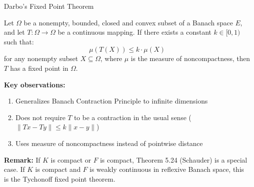 \documentclass[aspectratio=169,10pt]{beamer}
\begin{document}
\begin{frame}{Darbo's Fixed Point Theorem}

\begin{theorem}[6.24 - Darbo]
Let $\Omega$ be a nonempty, bounded, closed and convex subset of a Banach space $E$, and let $T: \Omega \to \Omega$ be a continuous mapping. If there exists a constant $k \in [0, 1)$ such that:
\[
\mu(T(X)) \leq k \cdot \mu(X)
\]
for any nonempty subset $X \subseteq \Omega$, where $\mu$ is the measure of noncompactness, then $T$ has a fixed point in $\Omega$.
\end{theorem}

\vspace{0.3cm}

\textbf{Key observations:}
\begin{enumerate}
    \item Generalizes Banach Contraction Principle to infinite dimensions
    \item Does not require $T$ to be a contraction in the usual sense ($\|Tx - Ty\| \leq k\|x - y\|$)
    \item Uses measure of noncompactness instead of pointwise distance
\end{enumerate}

\vspace{0.3cm}

\textbf{Remark:} If $K$ is compact or $F$ is compact, Theorem 5.24 (Schauder) is a special case. If $K$ is compact and $F$ is weakly continuous in reflexive Banach space, this is the Tychonoff fixed point theorem.

\end{frame}
\end{document}
